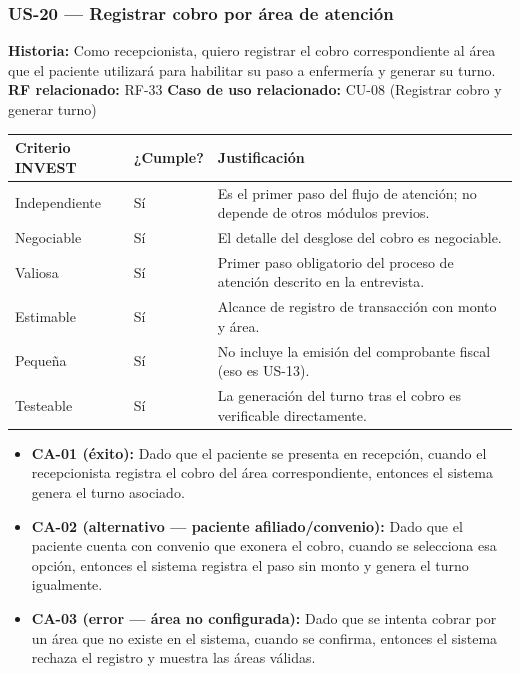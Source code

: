 \documentclass[11pt,a4paper]{article}
\providecommand{\tightlist}{%
	\setlength{\itemsep}{0pt}\setlength{\parskip}{0pt}}
\begin{document}
	\subsubsection{US-20 --- Registrar cobro por área de atención}
	
	\textbf{Historia:} Como recepcionista, quiero registrar el cobro correspondiente al área que el paciente utilizará para habilitar su paso a enfermería y generar su turno.
	\textbf{RF relacionado:} RF-33
	\textbf{Caso de uso relacionado:} CU-08 (Registrar cobro y generar turno)
	
	\begin{longtable}{p{} p{} p{}}
		
		
		\toprule
		\textbf{Criterio INVEST} &
		\textbf{¿Cumple?} &
		\textbf{Justificación} \\
		\midrule
		\endhead
		
		Independiente & Sí & Es el primer paso del flujo de atención; no depende de otros módulos previos. \\
		Negociable & Sí & El detalle del desglose del cobro es negociable. \\
		Valiosa & Sí & Primer paso obligatorio del proceso de atención descrito en la entrevista. \\
		Estimable & Sí & Alcance de registro de transacción con monto y área. \\
		Pequeña & Sí & No incluye la emisión del comprobante fiscal (eso es US-13). \\
		Testeable & Sí & La generación del turno tras el cobro es verificable directamente. \\
		\bottomrule
	\end{longtable}
	
	\begin{itemize}
		\tightlist
		\item
		\textbf{CA-01 (éxito):} Dado que el paciente se presenta en recepción, cuando el recepcionista registra el cobro del área correspondiente, entonces el sistema genera el turno asociado.
		\item
		\textbf{CA-02 (alternativo --- paciente afiliado/convenio):} Dado que el paciente cuenta con convenio que exonera el cobro, cuando se selecciona esa opción, entonces el sistema registra el paso sin monto y genera el turno igualmente.
		\item
		\textbf{CA-03 (error --- área no configurada):} Dado que se intenta cobrar por un área que no existe en el sistema, cuando se confirma, entonces el sistema rechaza el registro y muestra las áreas válidas.
	\end{itemize}
	
\end{document}
